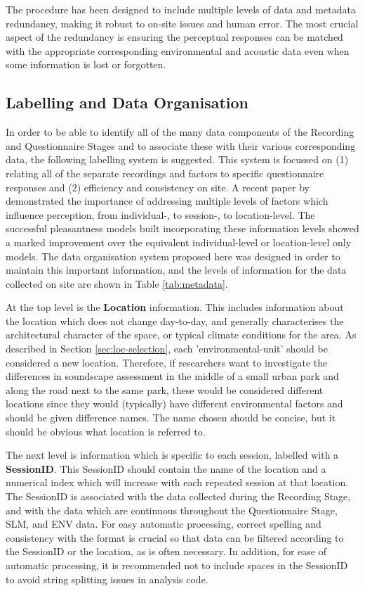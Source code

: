  The procedure has been designed to include multiple levels of data and metadata redundancy, making it robust to on-site issues and human error. The most crucial aspect of the redundancy is ensuring the perceptual responses can be matched with the appropriate corresponding environmental and acoustic data even when some information is lost or forgotten.

 \subsection{Labelling and Data Organisation}
   \label{section:metadata}
   In order to be able to identify all of the many data components of the Recording and Questionnaire Stages and to associate these with their various corresponding data, the following labelling system is suggested. This system is focussed on (1) relating all of the separate recordings and factors to specific questionnaire responses and (2) efficiency and consistency on site. A recent paper by \citet{Aumond2017Modeling} demonstrated the importance of addressing multiple levels of factors which influence perception, from individual-, to session-, to location-level. The successful pleasantness models built incorporating these information levels showed a marked improvement over the equivalent individual-level or location-level only models. The data organisation system proposed here was designed in order to maintain this important information, and the levels of information for the data collected on site are shown in Table \ref{tab:metadata}.

   At the top level is the \textbf{Location} information. This includes information about the location which does not change day-to-day, and generally characterises the architectural character of the space, or typical climate conditions for the area. As described in Section \ref{sec:loc-selection}, each '\gls{environmental-unit}' should be considered a new location. Therefore, if researchers want to investigate the differences in soundscape assessment in the middle of a small urban park and along the road next to the same park, these would be considered different locations since they would (typically) have different environmental factors and should be given difference names. The name chosen should be concise, but it should be obvious what location is referred to.

   The next level is information which is specific to each session, labelled with a \textbf{SessionID}. This SessionID should contain the name of the location and a numerical index which will increase with each repeated session at that location. The SessionID is associated with the data collected during the Recording Stage, and with the data which are continuous throughout the Questionnaire Stage, SLM, and ENV data. For easy automatic processing, correct spelling and consistency with the format is crucial so that data can be filtered according to the SessionID or the location, as is often necessary. In addition, for ease of automatic processing, it is recommended not to include spaces in the SessionID to avoid string splitting issues in analysis code.

